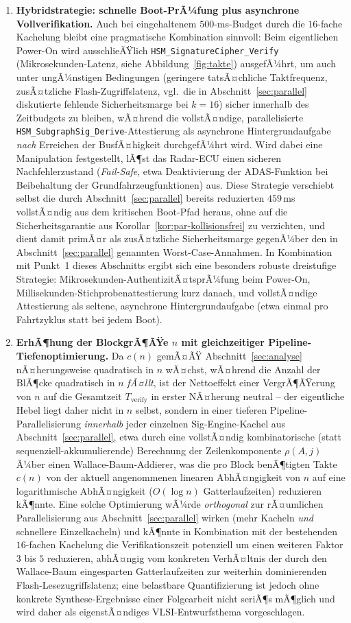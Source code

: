 ﻿\documentclass[a4paper,12pt]{article}
\theoremstyle{definition}
\begin{document}
\begin{enumerate}
	\item \textbf{Hybridstrategie: schnelle Boot-PrÃ¼fung plus asynchrone Vollverifikation.} Auch bei eingehaltenem $500$-ms-Budget durch die $16$-fache Kachelung bleibt eine pragmatische Kombination sinnvoll: Beim eigentlichen Power-On wird ausschlieÃŸlich \texttt{HSM\_SignatureCipher\_Verify} (Mikrosekunden-Latenz, siehe Abbildung~\ref{fig:takte}) ausgefÃ¼hrt, um auch unter ungÃ¼nstigen Bedingungen (geringere tatsÃ¤chliche Taktfrequenz, zusÃ¤tzliche Flash-Zugriffslatenz, vgl.\ die in Abschnitt~\ref{sec:parallel} diskutierte fehlende Sicherheitsmarge bei $k=16$) sicher innerhalb des Zeitbudgets zu bleiben, wÃ¤hrend die vollstÃ¤ndige, parallelisierte \texttt{HSM\_SubgraphSig\_Derive}-Attestierung als asynchrone Hintergrundaufgabe \emph{nach} Erreichen der BusfÃ¤higkeit durchgefÃ¼hrt wird. Wird dabei eine Manipulation festgestellt, lÃ¶st das Radar-ECU einen sicheren Nachfehlerzustand (\emph{Fail-Safe}, etwa Deaktivierung der ADAS-Funktion bei Beibehaltung der Grundfahrzeugfunktionen) aus. Diese Strategie verschiebt selbst die durch Abschnitt~\ref{sec:parallel} bereits reduzierten $459$\,ms vollstÃ¤ndig aus dem kritischen Boot-Pfad heraus, ohne auf die Sicherheitsgarantie aus Korollar~\ref{kor:par-kollisionsfrei} zu verzichten, und dient damit primÃ¤r als zusÃ¤tzliche Sicherheitsmarge gegenÃ¼ber den in Abschnitt~\ref{sec:parallel} genannten Worst-Case-Annahmen. In Kombination mit Punkt~1 dieses Abschnitts ergibt sich eine besonders robuste dreistufige Strategie: Mikrosekunden-AuthentizitÃ¤tsprÃ¼fung beim Power-On, Millisekunden-Stichprobenattestierung kurz danach, und vollstÃ¤ndige Attestierung als seltene, asynchrone Hintergrundaufgabe (etwa einmal pro Fahrtzyklus statt bei jedem Boot).
	\item \textbf{ErhÃ¶hung der BlockgrÃ¶ÃŸe $n$ mit gleichzeitiger Pipeline-Tiefenoptimierung.} Da $c(n)$ gemÃ¤ÃŸ Abschnitt~\ref{sec:analyse} nÃ¤herungsweise quadratisch in $n$ wÃ¤chst, wÃ¤hrend die Anzahl der BlÃ¶cke quadratisch in $n$ \emph{fÃ¤llt}, ist der Nettoeffekt einer VergrÃ¶ÃŸerung von $n$ auf die Gesamtzeit $T_{\mathrm{verify}}$ in erster NÃ¤herung neutral -- der eigentliche Hebel liegt daher nicht in $n$ selbst, sondern in einer tieferen Pipeline-Parallelisierung \emph{innerhalb} jeder einzelnen Sig-Engine-Kachel aus Abschnitt~\ref{sec:parallel}, etwa durch eine vollstÃ¤ndig kombinatorische (statt sequenziell-akkumulierende) Berechnung der Zeilenkomponente $\rho(A,j)$ Ã¼ber einen Wallace-Baum-Addierer, was die pro Block benÃ¶tigten Takte $c(n)$ von der aktuell angenommenen linearen AbhÃ¤ngigkeit von $n$ auf eine logarithmische AbhÃ¤ngigkeit ($O(\log n)$ Gatterlaufzeiten) reduzieren kÃ¶nnte. Eine solche Optimierung wÃ¼rde \emph{orthogonal} zur rÃ¤umlichen Parallelisierung aus Abschnitt~\ref{sec:parallel} wirken (mehr Kacheln \emph{und} schnellere Einzelkacheln) und kÃ¶nnte in Kombination mit der bestehenden $16$-fachen Kachelung die Verifikationszeit potenziell um einen weiteren Faktor $3$ bis $5$ reduzieren, abhÃ¤ngig vom konkreten VerhÃ¤ltnis der durch den Wallace-Baum eingesparten Gatterlaufzeiten zur weiterhin dominierenden Flash-Lesezugriffslatenz; eine belastbare Quantifizierung ist jedoch ohne konkrete Synthese-Ergebnisse einer Folgearbeit nicht seriÃ¶s mÃ¶glich und wird daher als eigenstÃ¤ndiges VLSI-Entwurfsthema vorgeschlagen.

\end{enumerate}
\end{document}
